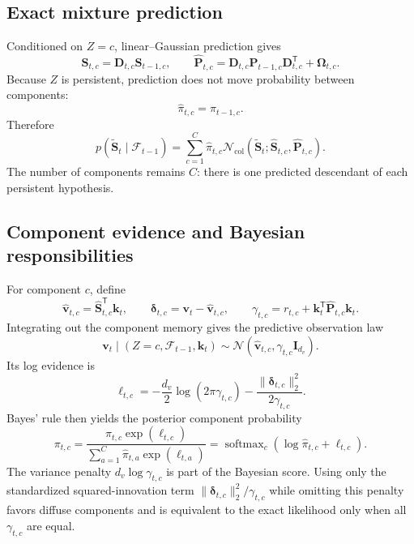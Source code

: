 \documentclass[11pt]{article}
\newcommand{\ve}[1]{\boldsymbol{#1}}
\newcommand{\tr}{\mathsf{T}}
\newcommand{\Normal}{\mathcal{N}}
\newcommand{\softmax}{\operatorname{softmax}}
\begin{document}
\subsection{Exact mixture prediction}

Conditioned on $Z=c$, linear--Gaussian prediction gives
\begin{equation}
  \widehat{\ve{S}}_{t,c}
  =\ve{D}_{t,c}\ve{S}_{t-1,c},
  \qquad
  \widehat{\ve{P}}_{t,c}
  =\ve{D}_{t,c}\ve{P}_{t-1,c}\ve{D}_{t,c}^{\tr}
   +\ve{\Omega}_{t,c}.
  \label{eq:kdn3-component-predict}
\end{equation}
Because $Z$ is persistent, prediction does not move probability between components:
\begin{equation}
  \widehat\pi_{t,c}=\pi_{t-1,c}.
  \label{eq:kdn3-weight-predict}
\end{equation}
Therefore
\begin{equation}
  p(\widetilde{\ve{S}}_t\mid\mathcal{F}_{t-1})
  =\sum_{c=1}^{C}\widehat\pi_{t,c}
   \Normal_{\mathrm{col}}(
     \widetilde{\ve{S}}_t;\widehat{\ve{S}}_{t,c},\widehat{\ve{P}}_{t,c}).
  \label{eq:kdn3-predictive-mixture}
\end{equation}
The number of components remains $C$: there is one predicted descendant of each persistent
hypothesis.

\subsection{Component evidence and Bayesian responsibilities}

For component $c$, define
\begin{equation}
  \widehat{\ve{v}}_{t,c}
  =\widehat{\ve{S}}_{t,c}^{\tr}\ve{k}_t,
  \qquad
  \ve{\delta}_{t,c}
  =\ve{v}_t-\widehat{\ve{v}}_{t,c},
  \qquad
  \gamma_{t,c}
  =r_{t,c}+\ve{k}_t^{\tr}\widehat{\ve{P}}_{t,c}\ve{k}_t.
  \label{eq:kdn3-component-innovation}
\end{equation}
Integrating out the component memory gives the predictive observation law
\begin{equation}
  \ve{v}_t\mid(Z=c,\mathcal{F}_{t-1},\ve{k}_t)
  \sim\Normal(
    \widehat{\ve{v}}_{t,c},
    \gamma_{t,c}\ve{I}_{d_v}).
  \label{eq:kdn3-component-predictive-observation}
\end{equation}
Its log evidence is
\begin{equation}
  \ell_{t,c}
  =-\frac{d_v}{2}\log(2\pi\gamma_{t,c})
   -\frac{\|\ve{\delta}_{t,c}\|_2^2}{2\gamma_{t,c}}.
  \label{eq:kdn3-component-log-evidence}
\end{equation}
Bayes' rule then yields the posterior component probability
\begin{equation}
  \pi_{t,c}
  =\frac{\widehat\pi_{t,c}\exp(\ell_{t,c})}
  {\sum_{a=1}^{C}\widehat\pi_{t,a}\exp(\ell_{t,a})}
  =\softmax_c\!\left(
    \log\widehat\pi_{t,c}+\ell_{t,c}
  \right).
  \label{eq:kdn3-responsibility}
\end{equation}
The variance penalty $d_v\log\gamma_{t,c}$ is part of the Bayesian score.  Using only the
standardized squared-innovation term
$\|\ve{\delta}_{t,c}\|_2^2/\gamma_{t,c}$ while omitting this penalty favors diffuse components and
is equivalent to the exact likelihood only when all $\gamma_{t,c}$ are equal.
\end{document}
